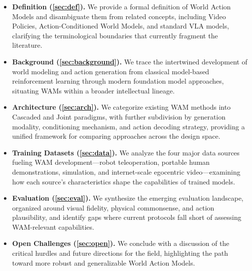 \begin{itemize}
    \item \textbf{Definition (\autoref{sec:def}).} We provide a formal definition of World Action Models and disambiguate them from related concepts, including Video Policies, Action-Conditioned World Models, and standard VLA models, clarifying the terminological boundaries that currently fragment the literature.
    
    \item \textbf{Background (\autoref{sec:background}).} We trace the intertwined development of world modeling and action generation from classical model-based reinforcement learning through modern foundation model approaches, situating WAMs within a broader intellectual lineage.
    
    \item \textbf{Architecture (\autoref{sec:arch}).} We categorize existing WAM methods into Cascaded and Joint paradigms, with further subdivision by generation modality, conditioning mechanism, and action decoding strategy, providing a unified framework for comparing approaches across the design space.
    
    \item \textbf{Training Datasets (\autoref{sec:data}).} We analyze the four major data sources fueling WAM development—robot teleoperation, portable human demonstrations, simulation, and internet-scale egocentric video—examining how each source's characteristics shape the capabilities of trained models.
    
    \item \textbf{Evaluation (\autoref{sec:eval}).} We synthesize the emerging evaluation landscape, organized around visual fidelity, physical commonsense, and action plausibility, and identify gaps where current protocols fall short of assessing WAM-relevant capabilities.

    \item \textbf{Open Challenges (\autoref{sec:open}).} We conclude with a discussion of the critical hurdles and future directions for the field, highlighting the path toward more robust and generalizable World Action Models.
\end{itemize}

